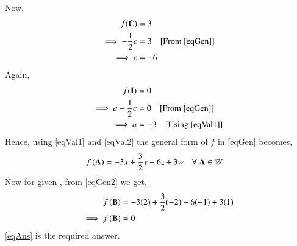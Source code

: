 \documentclass[journal,12pt,twocolumn]{IEEEtran}
\begin{document}
Now,
\begin{align}
f(\vec{C}) &= 3\\
\implies -\frac{1}{2}c &= 3 \quad{\text{[From \eqref{eqGen}]}}\\
\implies c &= -6\label{eqVal1}
\end{align}
Again,
\begin{align}
f(\vec{I}) &= 0\\
\implies a-\frac{1}{2}c &= 0 \quad{\text{[From \eqref{eqGen}]}}\\
\implies a &= -3 \quad{\text{[Using \eqref{eqVal1}]}}\label{eqVal2}
\end{align}
Hence, using \eqref{eqVal1} and \eqref{eqVal2} the general form of $f$ in \eqref{eqGen} becomes,
\begin{align}
f\brak{\vec{A}} &= -3x +\frac{3}{2}y-6z+3w \quad{\text{$\forall$ $\vec{A} \in \mathbb{W}$}}\label{eqGen2}
\end{align}
Now for given , from \eqref{eqGen2} we get,
\begin{align}
f\brak{\vec{B}} &= -3(2) +\frac{3}{2}(-2)-6(-1)+3(1)\\
\implies f\brak{\vec{B}} &= 0 \label{eqAns}
\end{align}
\eqref{eqAns} is the required answer.
\end{document}
